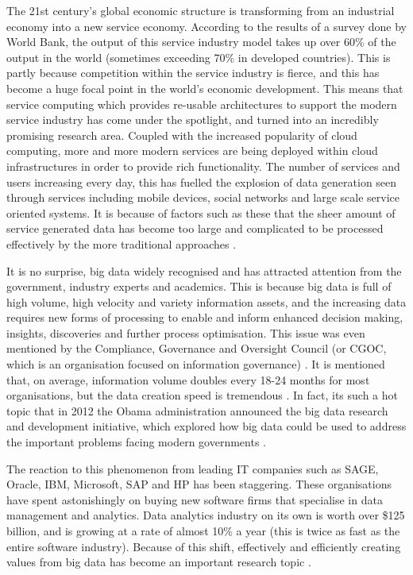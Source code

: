 The 21st century's global economic structure is transforming from an industrial economy into a new service economy. According to the results of a survey done by World Bank, the output of this service industry model takes up over 60\%  of the output in the world (sometimes exceeding 70\% in developed countries). This is partly because competition within the service industry is fierce, and this has become a huge focal point in the world's economic development. This means that service computing which provides re-usable architectures to support the modern service industry has come under the spotlight, and turned into an incredibly promising research area. Coupled with the increased popularity of cloud computing, more and more modern services are being deployed within cloud infrastructures in order to provide rich functionality. The number of services and users increasing every day, this has fuelled the explosion of data generation seen through services including mobile devices, social networks and large scale service oriented systems. It is because of factors such as these that the sheer amount of service generated data has become too large and complicated to be processed effectively by the more traditional approaches \cite{worldbank}.

It is no surprise, big data widely recognised and has attracted attention from the government, industry experts and academics. This is because big data is full of high volume, high velocity and variety information assets, and the increasing data requires new forms of processing to enable and inform enhanced decision making, insights, discoveries and further process optimisation. This issue was even mentioned by the Compliance, Governance and Oversight Council (or CGOC, which is an organisation focused on information governance) \cite{manyika2011big}. It is mentioned that, on average, information volume doubles every 18-24 months for most organisations, but the data creation speed is tremendous \cite{chen2014big}. In fact, its such a hot topic that in 2012 the Obama administration announced the big data research and development initiative, which explored how big data could be used to address the important problems facing modern governments \cite{wu2014data}.

The reaction to this phenomenon from leading IT companies such as SAGE, Oracle, IBM, Microsoft, SAP and HP has been staggering. These organisations have spent astonishingly on buying new software firms that specialise in data management and analytics. Data analytics industry on its own is worth over \$125 billion, and is growing at a rate of almost 10\% a year (this is twice as fast as the entire software industry). Because of this shift, effectively and efficiently creating values from big data has become an important research topic \cite{gantz2012digital}.


